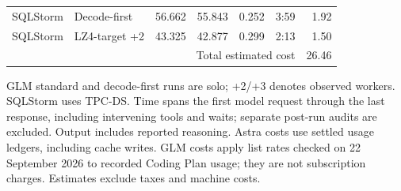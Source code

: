 \begin{table}[t]
\begin{tabular*}{\linewidth}{@{\extracolsep{\fill}}llrrrrr@{}}
SQLStorm & Decode-first & 56.662 & 55.843 & 0.252 & 3:59 & 1.92 \\
SQLStorm & LZ4-target +2 & 43.325 & 42.877 & 0.299 & 2:13 & 1.50 \\
\cmidrule(l){7-7}
\multicolumn{6}{r}{Total estimated cost} & 26.46 \\
\bottomrule
\end{tabular*}
\endgroup
\par\smallskip
\begin{minipage}{\linewidth}\footnotesize
GLM standard and decode-first runs are solo; +2/+3 denotes observed workers.
SQLStorm uses TPC-DS. Time spans the first model request through the last
response, including intervening tools and waits; separate post-run audits
are excluded. Output includes reported reasoning. Astra costs use settled
usage ledgers, including cache writes. GLM costs apply list rates checked
on 22 September 2026 to recorded Coding Plan usage; they are not subscription
charges. Estimates exclude taxes and machine costs.
\end{minipage}
\end{table}
